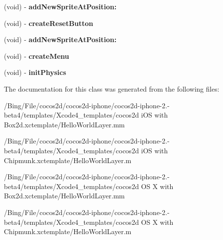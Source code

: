 \begin{DoxyCompactItemize}
\item 
\hypertarget{interface_hello_world_layer_07_08_a1d9f76267b1dabaa3f25f7530ef0b062}{(void) -\/ {\bfseries add\-New\-Sprite\-At\-Position\-:}}\label{interface_hello_world_layer_07_08_a1d9f76267b1dabaa3f25f7530ef0b062}

\item 
\hypertarget{interface_hello_world_layer_07_08_a816e77da1323550bd1bb9ad89354dec1}{(void) -\/ {\bfseries create\-Reset\-Button}}\label{interface_hello_world_layer_07_08_a816e77da1323550bd1bb9ad89354dec1}

\item 
\hypertarget{interface_hello_world_layer_07_08_a8741a3c83a9f7d9d177dae76464e37e9}{(void) -\/ {\bfseries add\-New\-Sprite\-At\-Position\-:}}\label{interface_hello_world_layer_07_08_a8741a3c83a9f7d9d177dae76464e37e9}

\item 
\hypertarget{interface_hello_world_layer_07_08_a638a1622a661b03a5648ddfa864ef113}{(void) -\/ {\bfseries create\-Menu}}\label{interface_hello_world_layer_07_08_a638a1622a661b03a5648ddfa864ef113}

\item 
\hypertarget{interface_hello_world_layer_07_08_ab3500df9c05677d31170bcb07a82f522}{(void) -\/ {\bfseries init\-Physics}}\label{interface_hello_world_layer_07_08_ab3500df9c05677d31170bcb07a82f522}

\end{DoxyCompactItemize}


The documentation for this class was generated from the following files\-:\begin{DoxyCompactItemize}
\item 
/\-Bing/\-File/cocos2d/cocos2d-\/iphone/cocos2d-\/iphone-\/2.-\/beta4/templates/\-Xcode4\-\_\-templates/cocos2d i\-O\-S with Box2d.\-xctemplate/Hello\-World\-Layer.\-mm\item 
/\-Bing/\-File/cocos2d/cocos2d-\/iphone/cocos2d-\/iphone-\/2.-\/beta4/templates/\-Xcode4\-\_\-templates/cocos2d i\-O\-S with Chipmunk.\-xctemplate/Hello\-World\-Layer.\-m\item 
/\-Bing/\-File/cocos2d/cocos2d-\/iphone/cocos2d-\/iphone-\/2.-\/beta4/templates/\-Xcode4\-\_\-templates/cocos2d O\-S X with Box2d.\-xctemplate/Hello\-World\-Layer.\-mm\item 
/\-Bing/\-File/cocos2d/cocos2d-\/iphone/cocos2d-\/iphone-\/2.-\/beta4/templates/\-Xcode4\-\_\-templates/cocos2d O\-S X with Chipmunk.\-xctemplate/Hello\-World\-Layer.\-m\end{DoxyCompactItemize}
